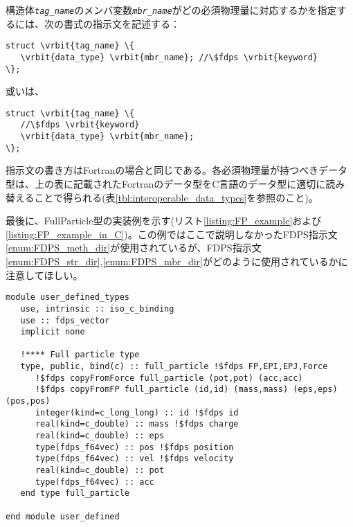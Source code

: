 構造体\textit{\texttt{tag\_name}}のメンバ変数\textit{\texttt{mbr\_name}}がどの必須物理量に対応するかを指定するには、次の書式の指示文を記述する：
\begin{screen}
\begin{Verbatim}[commandchars=\\\{\}]
struct \vrbit{tag_name} \{
   \vrbit{data_type} \vrbit{mbr_name}; //\$fdps \vrbit{keyword}
\};
\end{Verbatim}
\end{screen}

或いは、

\begin{screen}
\begin{Verbatim}[commandchars=\\\{\}]
struct \vrbit{tag_name} \{
   //\$fdps \vrbit{keyword}
   \vrbit{data_type} \vrbit{mbr_name};
\};
\end{Verbatim}
\end{screen}

指示文の書き方はFortranの場合と同じである。各必須物理量が持つべきデータ型は、上の表に記載されたFortranのデータ型をC言語のデータ型に適切に読み替えることで得られる(表\ref{tbl:interoperable_data_types}を参照のこと)。



最後に、FullParticle型の実装例を示す(リスト\ref{listing:FP_example}および\ref{listing:FP_example_in_C})。この例ではここで説明しなかったFDPS指示文\ref{enum:FDPS_meth_dir}が使用されているが、FDPS指示文\ref{enum:FDPS_str_dir},\ref{enum:FDPS_mbr_dir}がどのように使用されているかに注意してほしい。

\begin{lstlisting}[caption=ユーザ定義型の例 (Fortran),label=listing:FP_example]
module user_defined_types
   use, intrinsic :: iso_c_binding
   use :: fdps_vector
   implicit none
   
   !**** Full particle type
   type, public, bind(c) :: full_particle !$fdps FP,EPI,EPJ,Force
      !$fdps copyFromForce full_particle (pot,pot) (acc,acc)
      !$fdps copyFromFP full_particle (id,id) (mass,mass) (eps,eps) (pos,pos) 
      integer(kind=c_long_long) :: id !$fdps id
      real(kind=c_double) :: mass !$fdps charge
      real(kind=c_double) :: eps
      type(fdps_f64vec) :: pos !$fdps position
      type(fdps_f64vec) :: vel !$fdps velocity
      real(kind=c_double) :: pot
      type(fdps_f64vec) :: acc
   end type full_particle

end module user_defined
\end{lstlisting}

